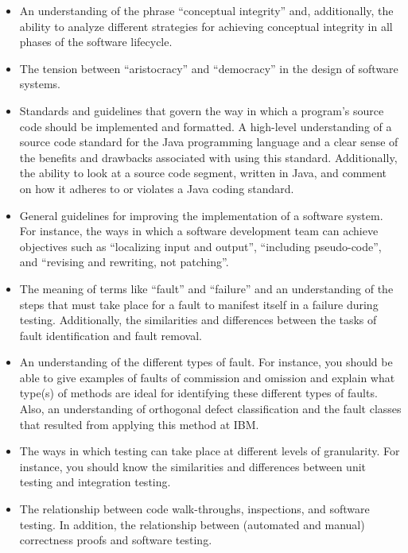 \begin{itemize}
  \item An understanding of the phrase ``conceptual integrity'' and, additionally, the ability to analyze different
    strategies for achieving conceptual integrity in all phases of the software lifecycle.

  \item The tension between ``aristocracy'' and ``democracy'' in the design of software systems.

  \item Standards and guidelines that govern the way in which a program's source code should be implemented and
    formatted. A high-level understanding of a source code standard for the Java programming language and a clear sense
    of the benefits and drawbacks associated with using this standard. Additionally, the ability to look at a source
    code segment, written in Java, and comment on how it adheres to or violates a Java coding standard.

  \item General guidelines for improving the implementation of a software system. For instance, the ways in which a
    software development team can achieve objectives such as ``localizing input and output'', ``including pseudo-code'',
    and ``revising and rewriting, not patching''.

  \item The meaning of terms like ``fault'' and ``failure'' and an understanding of the steps that must take place for a
    fault to manifest itself in a failure during testing. Additionally, the similarities and differences between the
    tasks of fault identification and fault removal.

  \item An understanding of the different types of fault. For instance, you should be able to give examples of faults of
    commission and omission and explain what type(s) of methods are ideal for identifying these different types of
    faults. Also, an understanding of orthogonal defect classification and the fault classes that resulted from applying
    this method at IBM.

  \item The ways in which testing can take place at different levels of granularity. For instance, you should know the
    similarities and differences between unit testing and integration testing.

  \item The relationship between code walk-throughs, inspections, and software testing. In addition, the relationship
    between (automated and manual) correctness proofs and software testing.


\end{itemize}
